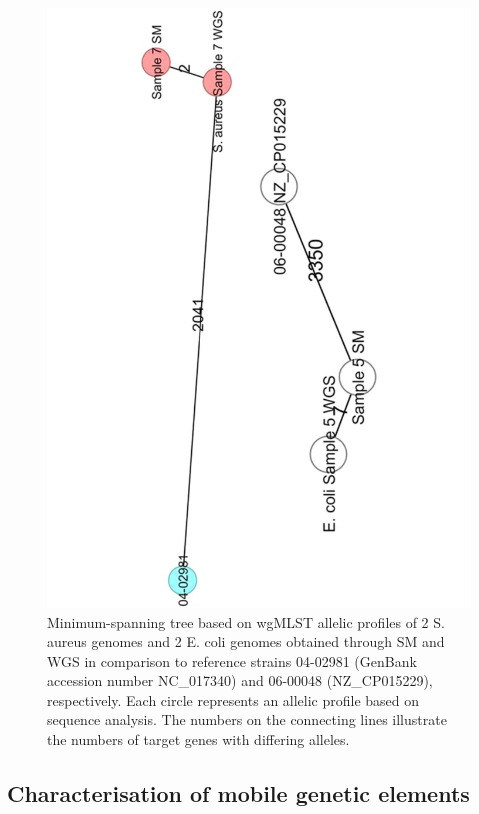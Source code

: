 \begin{figure}[h!]
\centering
\includegraphics[angle=-90,width=\textwidth]{figures/chapter 2/41598_2018_31873_Fig2_HTML.pdf}
\caption{Minimum-spanning tree based on wgMLST allelic profiles of 2 S. aureus genomes and 2 E. coli genomes obtained through SM and WGS in comparison to reference strains 04-02981 (GenBank accession number NC\_017340) and 06-00048 (NZ\_CP015229), respectively. Each circle represents an allelic profile based on sequence analysis. The numbers on the connecting lines illustrate the numbers of target genes with differing alleles.}
\label{fig:chap2_figure2}
\end{figure}

\subsection{Characterisation of mobile genetic elements}

